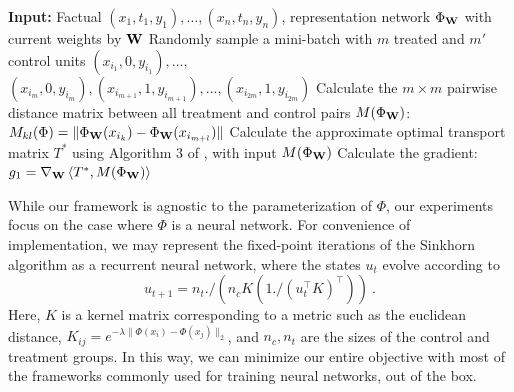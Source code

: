 \begin{algorithm}[tbp]
\caption{Computing the stochastic gradient of the Wasserstein distance}
\label{alg:wassgrad}
\begin{algorithmic}[1]
  \STATE \textbf{Input:} Factual  $(x_1,t_1,y_1), \ldots , (x_n,t_n,y_n)$, representation network $\Phi_{\bf{W}}$ with current weights by $\bf{W}$
  \STATE Randomly sample a mini-batch with $m$ treated and $m'$ control units $(x_{i_1},0,y_{i_1}), \ldots , $\\
  $(x_{i_m},0,y_{i_m}),  (x_{i_{m+1}},1,y_{i_{m+1}}), \ldots , (x_{i_{2m}},1,y_{i_{2m}}) $
   \STATE Calculate the $m \times m$ pairwise distance matrix between all treatment and control pairs $M(\Phi_{\bf{W}})$: \\
   $M_{kl}(\Phi) = \|\Phi_{\bf{W}}(x_{i_k}) - \Phi_{\bf{W}}(x_{i_{m+l}})\|$
    \STATE Calculate the approximate optimal transport matrix $T^*$ using Algorithm 3 of \citet{cuturi2014fast}, with input $M(\Phi_{\bf{W}})$
  \STATE Calculate the gradient:\\ $g_1 = \nabla_{\bf{W}} \left< T^*,M(\Phi_{\bf{W}})\right>$
  \vspace{0.2em}
\end{algorithmic}
\end{algorithm}


While our framework is agnostic to the parameterization of $\Phi$, our experiments focus on the case where $\Phi$ is a neural network. For convenience of implementation, we may represent the fixed-point iterations of the Sinkhorn algorithm as a recurrent neural network, where the states $u_t$ evolve according to
$$
u_{t+1} = n_t ./ (n_c K (1./(u_t^\top K)^\top))~.
$$
Here, $K$ is a kernel matrix corresponding to a metric such as the euclidean distance, $K_{ij} = e^{-\lambda\|\Phi(x_i) - \Phi(x_j)\|_2}$, and $n_c, n_t$ are the sizes of the control and treatment groups. In this way, we can minimize our entire objective with most of the frameworks commonly used for training neural networks, out of the box.

